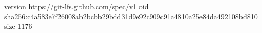 version https://git-lfs.github.com/spec/v1
oid sha256:c4a583e7f26008ab2bcbb29bdd31d9e92c909c91a4810a25e84da492108bd810
size 1176
